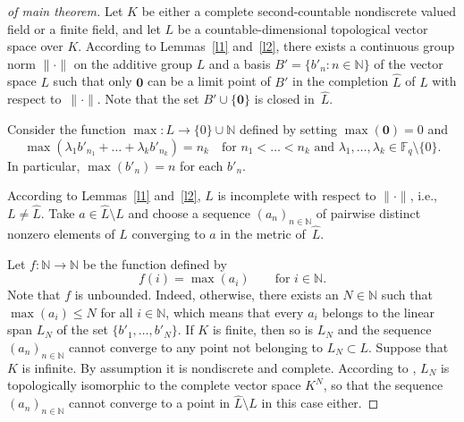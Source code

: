 \documentclass[a4paper]{amsart}
\theoremstyle{definition}
\let\le\leqslant
\begin{document}
\begin{proof}[of main theorem]
Let $K$ be either a complete second-countable non\-dis\-crete valued field or a finite field, and let 
$L$ be a countable-dimensional topological vector space over $K$. According to Lemmas~\ref{l1} and~\ref{l2}, 
there exists a continuous group norm $\lVert\boldsymbol\cdot\rVert$ on the additive group $L$ 
and a basis $B'=\{b'_n: n\in \mathbb N\}$ of the vector space $L$ such that only $\mathbf 0$ can be a limit 
point of $B'$ in the completion $\widehat L$ of $L$ with respect to~$\lVert\boldsymbol\cdot\rVert$. Note that 
the set $B' \cup \{\mathbf 0\}$ is closed in~$\widehat L$. 

Consider the function $\max\colon L\to \{0\}\cup \mathbb N$ defined by setting $\max(\mathbf 0) = 0$ and 
$$
\max (\lambda_1 b'_{n_1} + \dots + \lambda_k b'_{n_k}) = n_k
\quad \text{for $n_1< \dots < n_k$ and $\lambda_1, \dots, \lambda_k\in \mathbb F_q\setminus \{0\}$}.
$$
In particular, $\max(b'_n)=n$ for each $b'_n$.

According to Lemmas~\ref{l1} and~\ref{l2}, $L$ is incomplete with respect to $\lVert\boldsymbol\cdot\rVert$, i.e., 
$L\ne \widehat L$. Take $a\in \widehat L\setminus L$ 
and choose a sequence $(a_n)_{n\in \mathbb N}$ of pairwise distinct nonzero elements of $L$ converging to $a$ in 
the metric of~$\widehat L$. 

Let $f\colon \mathbb N\to \mathbb N$ be the function defined by 
$$ 
f(i) = \max(a_i) \qquad\text{for $i\in \mathbb N$}. 
$$
Note that $f$ is unbounded. Indeed, otherwise, there exists an $N\in \mathbb N$ such that $\max(a_i)\le N$ for all 
$i\in \mathbb N$, which means that every $a_i$ belongs to the linear span $L_N$ of the set $\{b'_1,\dots, b'_N\}$. 
If $K$ is finite, then so is $L_N$ and the sequence $(a_n)_{n\in \mathbb N}$ cannot converge to any point not 
belonging to $L_N\subset L$. Suppose that $K$ is infinite. By assumption it is nondiscrete and complete. 
According to \cite[Sec.~I.2.3, Theorem~2]{Bourbaki}, $L_N$ is topologically isomorphic to the complete vector 
space $K^N$, so that the sequence $(a_n)_{n\in \mathbb N}$ cannot converge to a point in $\widehat L\setminus L$ 
in this case either. 


\end{proof}
\end{document}
